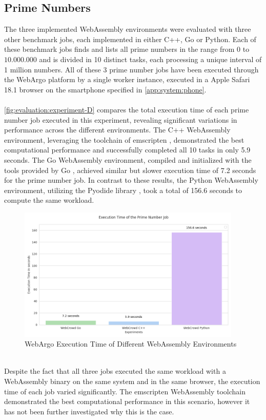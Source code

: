 \subsection{Prime Numbers}
The three implemented WebAssembly environments were evaluated with three other benchmark jobs, each implemented in either C++, Go or Python. Each of these benchmark jobs finds and lists all prime numbers in the range from $0$ to $10.000.000$ and is divided in 10 distinct tasks, each processing a unique interval of 1 million numbers. All of these 3 prime number jobs have been executed through the WebArgo platform by a single worker instance, executed in a Apple Safari 18.1 \cite{evaluation:safari} browser on the smartphone specified in \autoref{app:system:phone}.
\\~\\
\autoref{fig:evaluation:experiment-D} compares the total execution time of each prime number job executed in this experiment, revealing significant variations in performance across the different environments. The C++ WebAssembly environment, leveraging the toolchain of emscripten \cite{methodology:emcc}, demonstrated the best computational performance and successfully completed all 10 tasks in only 5.9 seconds. The Go WebAssembly environment, compiled and initialized with the tools provided by Go \cite{methodology:go}, achieved similar but slower execution time of 7.2 seconds for the prime number job. In contrast to these results, the Python WebAssembly environment, utilizing the Pyodide library \cite{methodology:pyodie}, took a total of 156.6 seconds to compute the same workload.
\begin{figure}[htbp]
    \centering
    \includegraphics[width=0.95\textwidth]{gfx/figures/Evaluation_D.png}
    \caption{WebArgo Execution Time of Different WebAssembly Environments}
    \label{fig:evaluation:experiment-D}
\end{figure}
~\\
Despite the fact that all three jobs executed the same workload with a WebAssembly binary on the same system and in the same browser, the execution time of each job varied significantly. The emscripten \cite{methodology:emcc} WebAssembly toolchain demonstrated the best computational performance in this scenario, however it has not been further investigated why this is the case.

